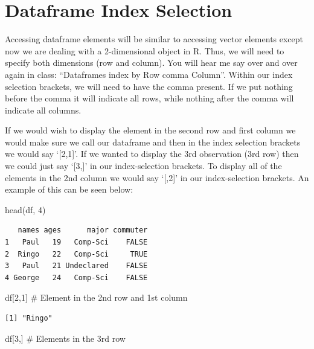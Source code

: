 \documentclass[
  letterpaper,
  DIV=11,
  numbers=noendperiod]{scrreprt}
\newenvironment{Shaded}{\begin{snugshade}}{\end{snugshade}}
\newcommand{\CommentTok}[1]{\textcolor[rgb]{0.37,0.37,0.37}{#1}}
\newcommand{\DecValTok}[1]{\textcolor[rgb]{0.68,0.00,0.00}{#1}}
\newcommand{\FunctionTok}[1]{\textcolor[rgb]{0.28,0.35,0.67}{#1}}
\newcommand{\NormalTok}[1]{\textcolor[rgb]{0.00,0.23,0.31}{#1}}
\begin{document}
\section{Dataframe Index Selection}\label{dataframe-index-selection}

Accessing dataframe elements will be similar to accessing vector
elements except now we are dealing with a 2-dimensional object in R.
Thus, we will need to specify both dimensions (row and column). You will
hear me say over and over again in class: ``Dataframes index by Row
comma Column''. Within our index selection brackets, we will need to
have the comma present. If we put nothing before the comma it will
indicate all rows, while nothing after the comma will indicate all
columns.

If we would wish to display the element in the second row and first
column we would make sure we call our dataframe and then in the index
selection brackets we would say `{[}2,1{]}'. If we wanted to display the
3rd observation (3rd row) then we could just say `{[}3,{]}' in our
index-selection brackets. To display all of the elements in the 2nd
column we would say `{[},2{]}' in our index-selection brackets. An
example of this can be seen below:

\begin{Shaded}
\begin{Highlighting}[]
\FunctionTok{head}\NormalTok{(df, }\DecValTok{4}\NormalTok{)}
\end{Highlighting}
\end{Shaded}

\begin{verbatim}
   names ages      major commuter
1   Paul   19   Comp-Sci    FALSE
2  Ringo   22   Comp-Sci     TRUE
3   Paul   21 Undeclared    FALSE
4 George   24   Comp-Sci    FALSE
\end{verbatim}

\begin{Shaded}
\begin{Highlighting}[]
\NormalTok{df[}\DecValTok{2}\NormalTok{,}\DecValTok{1}\NormalTok{] }\CommentTok{\# Element in the 2nd row and 1st column}
\end{Highlighting}
\end{Shaded}

\begin{verbatim}
[1] "Ringo"
\end{verbatim}

\begin{Shaded}
\begin{Highlighting}[]
\NormalTok{df[}\DecValTok{3}\NormalTok{,] }\CommentTok{\# Elements in the 3rd row}
\end{Highlighting}
\end{Shaded}
\end{document}
